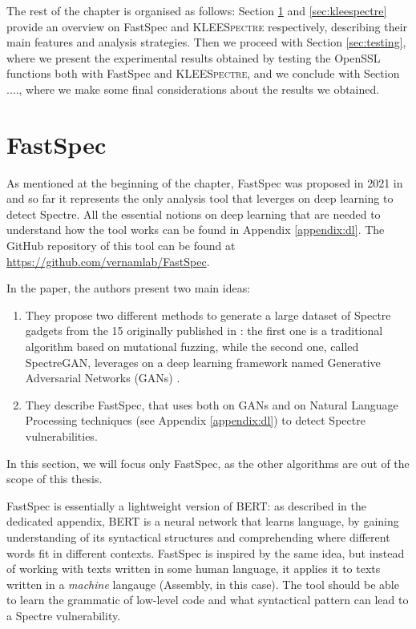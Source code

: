 \documentclass[12pt,a4paper]{book}
\theoremstyle{definition}
\begin{document}
	The rest of the chapter is organised as follows: Section \ref{sec:fastspec} and \ref{sec:kleespectre} provide an overview on FastSpec and \textsc{KLEESpectre} respectively, describing their main features and analysis strategies. Then we proceed with Section \ref{sec:testing}, where we present the experimental results obtained by testing the OpenSSL functions both with FastSpec and \textsc{KLEESpectre}, and we conclude with Section ...., where we make some final considerations about the results we obtained. 

	\section{FastSpec}\label{sec:fastspec}
	As mentioned at the beginning of the chapter, FastSpec was proposed in 2021 in \cite{Tol2021} and so far it represents the only analysis tool that leverges on deep learning to detect Spectre. All the essential notions on deep learning that are needed to understand how the tool works can be found in Appendix \ref{appendix:dl}. The GitHub repository of this tool can be found at \url{https://github.com/vernamlab/FastSpec}. 
	
	In the paper, the authors present two main ideas: 
	\begin{enumerate}
		\item They propose two different methods to generate a large dataset of Spectre gadgets from the 15 originally published in \cite{Kocher2018}: the first one is a traditional algorithm based on mutational fuzzing, while the second one, called SpectreGAN, leverages on a deep learning framework named Generative Adversarial Networks (GANs) \cite{Goodfellow2014}.
		\item They describe FastSpec, that uses both on GANs and on Natural Language Processing techniques (see Appendix \ref{appendix:dl}) to detect Spectre vulnerabilities.
	\end{enumerate}

	In this section, we will focus only FastSpec, as the other algorithms are out of the scope of this thesis.
	
	FastSpec is essentially a lightweight version of BERT: as described in the dedicated appendix, BERT is a neural network that learns language, by gaining understanding of its syntactical structures and comprehending where different words fit in different contexts. FastSpec is inspired by the same idea, but instead of working with texts written in some human language, it applies it to texts written in a \textit{machine} langauge (Assembly, in this case). The tool should be able to learn the grammatic of low-level code and what syntactical pattern can lead to a Spectre vulnerability.
	
\end{document}
